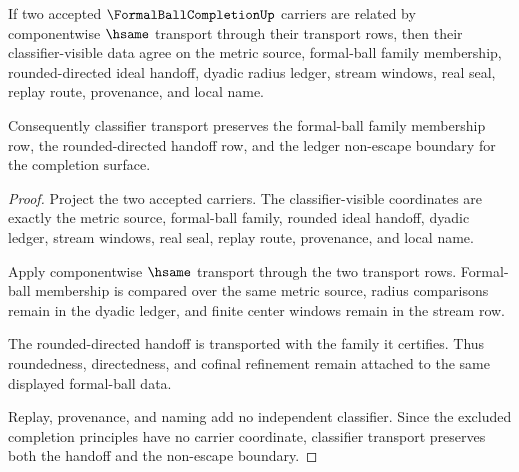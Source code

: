 \begin{theorem}
\label{thm:formal-ball-completion-classifier-boundary}
If two accepted $\FormalBallCompletionUp$ carriers are related by componentwise $\hsame$ transport through their transport rows, then their classifier-visible data agree on the metric source, formal-ball family membership, rounded-directed ideal handoff, dyadic radius ledger, stream windows, real seal, replay route, provenance, and local name.

Consequently classifier transport preserves the formal-ball family membership row, the rounded-directed handoff row, and the ledger non-escape boundary for the completion surface.
\end{theorem}
\begin{proof}
Project the two accepted carriers. The classifier-visible coordinates are exactly the metric source, formal-ball family, rounded ideal handoff, dyadic ledger, stream windows, real seal, replay route, provenance, and local name.

Apply componentwise $\hsame$ transport through the two transport rows. Formal-ball membership is compared over the same metric source, radius comparisons remain in the dyadic ledger, and finite center windows remain in the stream row.

The rounded-directed handoff is transported with the family it certifies. Thus roundedness, directedness, and cofinal refinement remain attached to the same displayed formal-ball data.

Replay, provenance, and naming add no independent classifier. Since the excluded completion principles have no carrier coordinate, classifier transport preserves both the handoff and the non-escape boundary.
\end{proof}


\begin{closurestatus}{\FormalBallCompletionUp}
  \theoryclosure{\seedClosure}
  \formalstatus{\unformalizedV}
\end{closurestatus}
